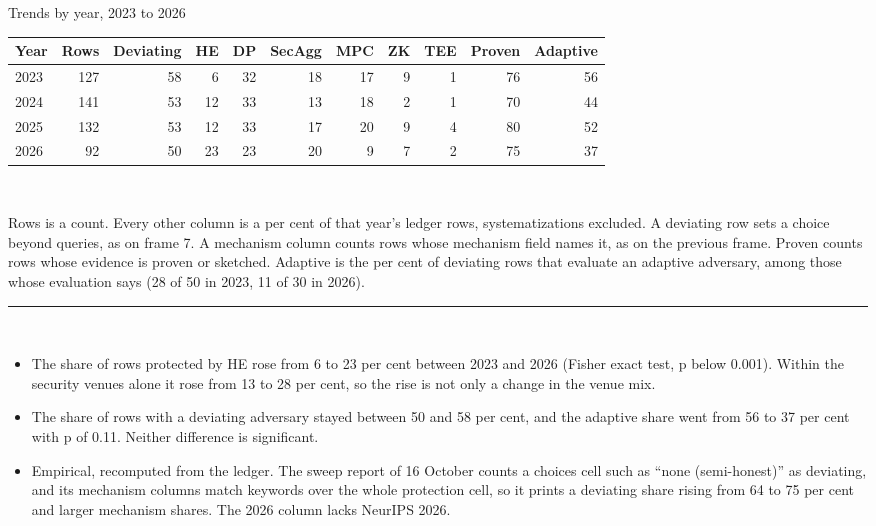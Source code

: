 \documentclass[aspectratio=169,10pt]{beamer}
\newcommand{\redline}{\textcolor{kred}{\rule{\textwidth}{1pt}}}
\begin{document}
\begin{frame}{Trends by year, 2023 to 2026}
  \begin{center}
  \footnotesize
  \setlength{\tabcolsep}{6pt}
  \begin{tabular}{@{}lrrrrrrrrrr@{}}
    \toprule
    Year & Rows & Deviating & HE & DP & SecAgg & MPC & ZK & TEE & Proven & Adaptive\\
    \midrule
    2023 & 127 & 58 & 6  & 32 & 18 & 17 & 9 & 1 & 76 & 56\\
    2024 & 141 & 53 & 12 & 33 & 13 & 18 & 2 & 1 & 70 & 44\\
    2025 & 132 & 53 & 12 & 33 & 17 & 20 & 9 & 4 & 80 & 52\\
    2026 & 92  & 50 & 23 & 23 & 20 & 9  & 7 & 2 & 75 & 37\\
    \bottomrule
  \end{tabular}\\[0.4em]
  \scriptsize\begin{minipage}{0.92\textwidth}
  Rows is a count. Every other column is a per cent of that year's ledger rows, systematizations excluded. A deviating row sets a choice beyond queries, as on frame 7. A mechanism column counts rows whose mechanism field names it, as on the previous frame. Proven counts rows whose evidence is proven or sketched. Adaptive is the per cent of deviating rows that evaluate an adaptive adversary, among those whose evaluation says (28 of 50 in 2023, 11 of 30 in 2026).
  \end{minipage}
  \end{center}
  \vspace{0.3em}
  \redline\\[0.3em]
  \small
  \begin{itemize}
    \item The share of rows protected by HE rose from 6 to 23 per cent between 2023 and 2026 (Fisher exact test, p below 0.001). Within the security venues alone it rose from 13 to 28 per cent, so the rise is not only a change in the venue mix.
    \item The share of rows with a deviating adversary stayed between 50 and 58 per cent, and the adaptive share went from 56 to 37 per cent with p of 0.11. Neither difference is significant.
    \item Empirical, recomputed from the ledger. The sweep report of 16 October counts a choices cell such as ``none (semi-honest)'' as deviating, and its mechanism columns match keywords over the whole protection cell, so it prints a deviating share rising from 64 to 75 per cent and larger mechanism shares. The 2026 column lacks NeurIPS 2026.
  \end{itemize}
\end{frame}
\end{document}
